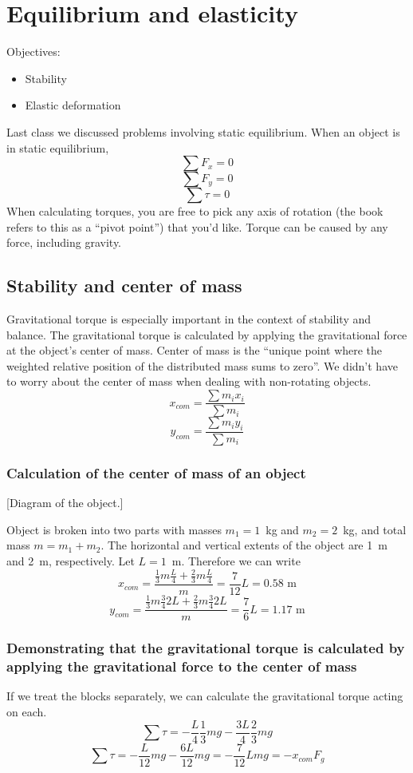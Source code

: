\section{Equilibrium and elasticity}
Objectives:
\begin{itemize}
\item Stability
\item Elastic deformation
\end{itemize}

Last class we discussed problems involving static equilibrium. When an object is in static equilibrium,
$$\sum F_x=0$$
$$\sum F_y=0$$
$$\sum \tau=0$$
When calculating torques, you are free to pick any axis of rotation (the book refers to this as a ``pivot point'') that you'd like. Torque can be caused by any force, including gravity. 

\subsection{Stability and center of mass}
Gravitational torque is especially important in the context of stability and balance. The gravitational torque is calculated by applying the gravitational force at the object's center of mass. Center of mass is the ``unique point where the weighted relative position of the distributed mass sums to zero''. We didn't have to worry about the center of mass when dealing with non-rotating objects.
$$x_{com} = \frac{\sum m_ix_i}{\sum m_i}$$
$$y_{com} = \frac{\sum m_iy_i}{\sum m_i}$$

\subsubsection*{Calculation of the center of mass of an object}
[Diagram of the object.]
\vspace{4cm}

Object is broken into two parts with masses $m_1=1$~kg and $m_2=2$~kg, and total mass $m=m_1+m_2$. The horizontal and vertical extents of the object are 1~m and 2~m, respectively. Let $L=1$~m. Therefore we can write
$$x_{com} = \frac{\frac{1}{3}m\frac{L}{4} + \frac{2}{3}m\frac{L}{4}}{m} = \frac{7}{12}L = 0.58\mbox{ m}$$
$$y_{com} = \frac{\frac{1}{3}m\frac{3}{4}2L + \frac{2}{3}m\frac{3}{4}2L}{m} = \frac{7}{6}L = 1.17\mbox{ m}$$



\subsubsection*{Demonstrating that the gravitational torque is calculated by applying the gravitational force to the center of mass}
If we treat the blocks separately, we can calculate the gravitational torque acting on each.
$$\sum \tau = -\frac{L}{4}\frac{1}{3}mg - \frac{3L}{4}\frac{2}{3}mg$$
$$\sum \tau = -\frac{L}{12}mg - \frac{6L}{12}mg = -\frac{7}{12}Lmg = -x_{com}F_g$$

